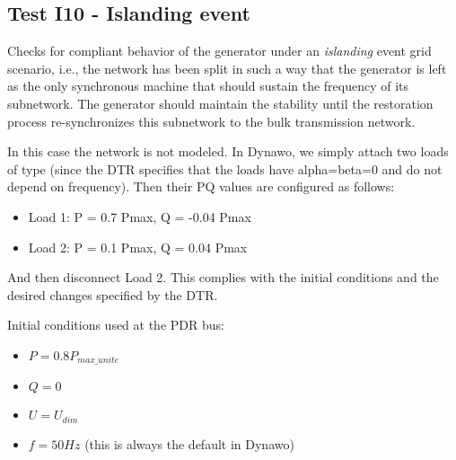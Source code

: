     \renewcommand{\DTRPcs}{Islanding} %
    \renewcommand{\OCname}{DeltaP10DeltaQ4}


    \subsection{Test I10 - Islanding event}

    Checks for compliant behavior of the generator under an
    \emph{islanding} event grid scenario, i.e., the network has been split in
    such a way that the generator is left as the only synchronous machine
    that should sustain the frequency of its subnetwork. The generator
    should maintain the stability until the restoration process
    re-synchronizes this subnetwork to the bulk transmission network.

    \GridCircuitZthree

    In this case the network is not modeled. In Dynawo, we simply attach
    two loads of type  (since the DTR specifies that the
    loads have alpha=beta=0 and do not depend on frequency). Then their
    PQ values are configured as follows:
    \begin{itemize}
        \item Load 1: P = 0.7 Pmax, Q = -0.04 Pmax
        \item Load 2: P = 0.1 Pmax, Q = 0.04 Pmax
    \end{itemize}
    And then disconnect Load 2. This complies with the initial conditions
    and the desired changes specified by the DTR.

    \begin{description}
        \item Initial conditions used at the PDR bus:
        \begin{itemize}
            \item $P = 0.8 P_{max\_unite}$
            \item $Q = 0$
            \item $U = U_{dim}$
            \item $f = 50 Hz$ (this is always the default in Dynawo)
        \end{itemize}
    \end{description}

